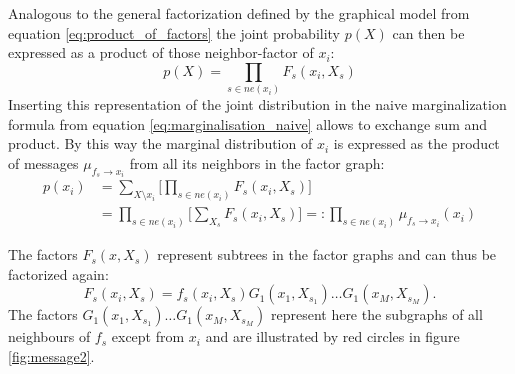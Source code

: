 \documentclass{sigkdd}
\begin{document}
Analogous to the general factorization defined by the graphical model from equation \ref{eq:product_of_factors} the joint probability $p(X)$ can then be expressed as a product of those neighbor-factor of $x_i$:
\begin{equation}\label{eq:product_of_neighbours}
p(X)= \prod_{s \in ne(x_i)} F_s(x_i, X_s)
\end{equation}
Inserting this representation of the joint distribution in the naive marginalization formula from equation \ref{eq:marginalisation_naive} allows to exchange sum and product. By this way the marginal distribution of $x_i$ is expressed as the product of messages $\mu_{f_s \rightarrow x_i}$ from all its neighbors in the factor graph:
\begin{equation}\label{eq:message1}
\begin{split}
p(x_i) &= \sum_{X \setminus x_i} \Big[ \prod_{s \in ne(x_i)} F_s(x_i, X_s) \Big] \\ &= \prod_{s \in ne(x_i)} \Big[ \sum_{X_s} F_s(x_i, X_s)\Big] =: \prod_{s \in ne(x_i)} \mu_{f_s \rightarrow x_i}(x_i)
\end{split}
\end{equation}

The factors $F_s(x,X_s)$ represent subtrees in the factor graphs and can thus be factorized again: 
\begin{equation}\label{eq:product2}
F_s(x_i,X_s) = f_s(x_i, X_s) G_1(x_1, X_{s_1})\dots G_1(x_M, X_{s_M}).
\end{equation}
The factors $G_1(x_1, X_{s_1})\dots G_1(x_M, X_{s_M})$ represent here the subgraphs of all neighbours of $f_s$ except from $x_i$ and are illustrated by red circles in figure \ref{fig:message2}.
\end{document}
